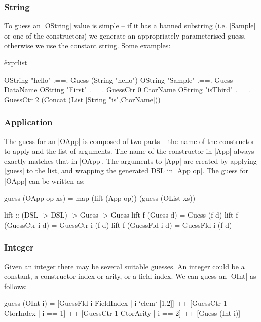 \documentclass{llncs}
\begin{document}
\subsubsection{String}

To guess an |OString| value is simple -- if it has a banned substring (i.e. |Sample| or one of the constructors) we generate an appropriately parameterised guess, otherwise we use the constant string. Some examples:

\h{exprlist}\begin{code}
OString "hello" .==. Guess (String "hello")
OString "Sample" .==. Guess DataName
OString "First" .==. GuessCtr 0 CtorName
OString "isThird" .==. GuessCtr 2 (Concat (List [String "is",CtorName]))
\end{code}

\subsubsection{Application}

The guess for an |OApp| is composed of two parts -- the name of the constructor to apply and the list of arguments. The name of the constructor in |App| always exactly matches that in |OApp|. The arguments to |App| are created by applying |guess| to the list, and wrapping the generated DSL in |App op|. The guess for |OApp| can be written as:

\begin{code}
guess (OApp op xs) = map (lift (App op)) (guess (OList xs))

lift :: (DSL -> DSL) -> Guess -> Guess
lift f (Guess       d) = Guess       (f d)
lift f (GuessCtr i  d) = GuessCtr i  (f d)
lift f (GuessFld i  d) = GuessFld i  (f d)
\end{code}

\subsubsection{Integer}

Given an integer there may be several suitable guesses. An integer could be a constant, a constructor index or arity, or a field index. We can guess an |OInt| as follows:

\begin{code}
guess (OInt i) =
    [GuessFld  i  FieldIndex  | i `elem` [1,2]] ++
    [GuessCtr  1  CtorIndex   | i == 1] ++
    [GuessCtr  1  CtorArity   | i == 2] ++
    [Guess (Int i)]
\end{code}
\end{document}
